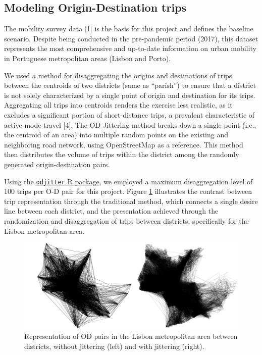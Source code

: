 \documentclass[runningheads]{llncs}
\begin{document}
\hypertarget{modeling-origin-destination-trips}{%
\subsection{Modeling Origin-Destination
trips}\label{modeling-origin-destination-trips}}

The mobility survey data {[}1{]} is the basis for this project and
defines the baseline scenario. Despite being conducted in the
pre-pandemic period (2017), this dataset represents the most
comprehensive and up-to-date information on urban mobility in Portuguese
metropolitan areas (Lisbon and Porto).

We used a method for disaggregating the origins and destinations of
trips between the centroids of two districts (same as ``parish'') to
ensure that a district is not solely characterized by a single point of
origin and destination for its trips. Aggregating all trips into
centroids renders the exercise less realistic, as it excludes a
significant portion of short-distance trips, a prevalent characteristic
of active mode travel {[}4{]}. The OD Jittering method breaks down a
single point (i.e., the centroid of an area) into multiple random points
on the existing and neighboring road network, using OpenStreetMap as a
reference. This method then distributes the volume of trips within the
district among the randomly generated origin-destination pairs.

Using the
\href{https://github.com/dabreegster/odjitter}{\texttt{odjitter} R
package}, we employed a maximum disaggregation level of 100 trips per
O-D pair for this project. Figure \ref{fig:jitter} illustrates the
contrast between trip representation through the traditional method,
which connects a single desire line between each district, and the
presentation achieved through the randomization and disaggregation of
trips between districts, specifically for the Lisbon metropolitan area.

\begin{figure}

{\centering \includegraphics[width=1\linewidth,]{img/jitter} 

}

\caption{Representation of OD pairs in the Lisbon metropolitan area between districts, without jittering (left) and with jittering (right).}\label{fig:jitter}
\end{figure}
\end{document}
